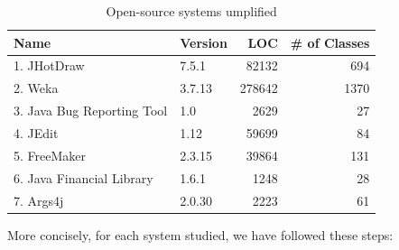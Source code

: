 \begin{table}
\caption{Open-source systems umplified}
\label{table:umplifiedSystems}
\centering
\begin{tabular}{l|lrr}
\toprule
\rowcolor[HTML]{BBDAFF}
\textbf{Name} & \textbf{Version} & \textbf{LOC} & \textbf{\# of Classes} \\ \midrule
 1. JHotDraw \cite{jhotdraw}                   & 7.5.1   & 82132   & 694      \\ 
\hline 2.  Weka \cite{wekasvn}      & 3.7.13  & 278642  & 1370        \\ 
\hline  3. Java Bug Reporting Tool\cite{jbrtsvn} 		& 1.0     & 2629    & 27        \\ 
\hline  4. JEdit\cite{jeditsvn}                   	& 1.12    & 59699   & 84         \\ 
\hline  5. FreeMaker\cite{freemakersvn}               & 2.3.15  & 39864   & 131         \\ 
\hline  6. Java Financial Library\cite{jflsvn}  		& 1.6.1   & 1248    & 28          \\ 
\hline  7. Args4j\cite{args4jsvn}                 	 & 2.0.30  & 2223    & 61            \\
\bottomrule
\end{tabular}
\end{table}

More concisely, for each system studied, we have followed these steps:

